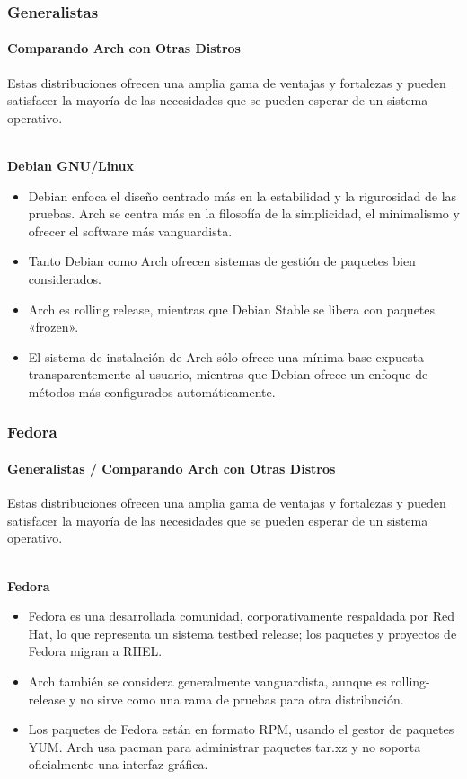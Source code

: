 \documentclass[9pt,t]{beamer}
\begin{document}
\begin{frame}\justifying
  \frametitle{Generalistas}
  \framesubtitle{Comparando Arch con Otras Distros}
    Estas distribuciones ofrecen una amplia gama de ventajas y fortalezas y pueden satisfacer la mayoría 
    de las necesidades que se pueden esperar de un sistema operativo.
    \ \\ \ \\
    {\small
    {\bf Debian GNU/Linux}
    \begin{itemize}\justifying
      \item Debian enfoca el diseño centrado más en la estabilidad y la rigurosidad de las pruebas. 
      Arch se centra más en la filosofía de la simplicidad, el minimalismo y ofrecer el software más vanguardista.
      \item Tanto Debian como Arch ofrecen sistemas de gestión de paquetes bien considerados.
      \item Arch es rolling release, mientras que Debian Stable se libera con paquetes «frozen».
      \item El sistema de instalación de Arch sólo ofrece una mínima base expuesta transparentemente 
      al usuario, mientras que Debian ofrece un enfoque de métodos más configurados automáticamente. 
    \end{itemize}
    }
\end{frame}

\begin{frame}\justifying
  \frametitle{Fedora}
  \framesubtitle{Generalistas / Comparando Arch con Otras Distros}
    Estas distribuciones ofrecen una amplia gama de ventajas y fortalezas y pueden satisfacer la mayoría 
    de las necesidades que se pueden esperar de un sistema operativo.
    \ \\ \ \\
    {\small
    {\bf Fedora}
    \begin{itemize}\justifying
      \item Fedora es una desarrollada comunidad, corporativamente respaldada por Red Hat, lo que representa 
      un sistema testbed release; los paquetes y proyectos de Fedora migran a RHEL.
      \item Arch también se considera generalmente vanguardista, aunque es rolling-release y no sirve como 
      una rama de pruebas para otra distribución.
      \item Los paquetes de Fedora están en formato RPM, usando el gestor de paquetes YUM. Arch usa pacman para 
      administrar paquetes tar.xz y no soporta oficialmente una interfaz gráfica.
    \end{itemize}
    }
\end{frame}
\end{document}
